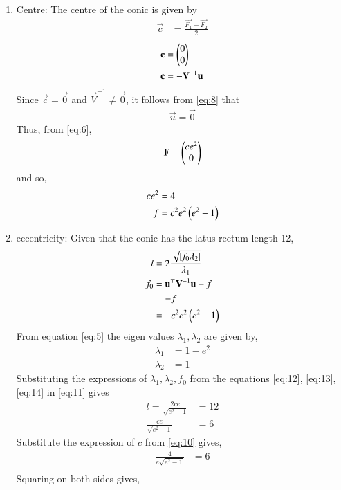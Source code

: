 \documentclass[journal,12pt,twocolumn]{IEEEtran}
\begin{document}
\begin{enumerate}
\begin{enumerate}
\item Centre: The centre of the conic is given by
\begin{align}
\vec{c} &= \frac{\vec{F_1} + \vec{F_2}}{2}
\end{align}
\begin{align}
\mathbf{c} &= \begin{pmatrix}0\\0\end{pmatrix}\\
\mathbf{c} &= -\mathbf{V}^{-1}\mathbf{u}
\label{eq:8}
\end{align}
Since $\vec{c} = \vec{0}$ and $\vec{V}^{-1} \neq \vec{0}$, it follows from \eqref{eq:8} that 
\begin{align}
\vec{u} = \vec{0}
\end{align}
Thus, from \eqref{eq:6},
\begin{align}
\mathbf{F} = \begin{pmatrix}ce^2\\0\end{pmatrix}
\label{eq:9}
\end{align}
and so,
\begin{align}
ce^2 &= 4
\label{eq:10}\\
f &= c^2e^2\left(e^2-1\right)
\label{eq:10_a}
\end{align}
\item eccentricity: Given that the conic has the latus rectum length 12,
\begin{align}
l &= 2\frac{\sqrt{\left\vert f_0\lambda_2\right\vert}}{\lambda_1}
\label{eq:11}\\
f_0 &= \mathbf{u}^\top\mathbf{V}^{-1}\mathbf{u} - f\\
&= -f\\
&= -c^2e^2\left(e^2-1\right)
\label{eq:12}
\end{align}
From equation \eqref{eq:5} the eigen values $\lambda_1, \lambda_2$ are given by,
\begin{align}
\lambda_1 &= 1-e^2
\label{eq:13}\\
\lambda_2 &= 1
\label{eq:14}
\end{align}
Substituting the expressions of $\lambda_1,\lambda_2, f_0$ from the equations \eqref{eq:12}, \eqref{eq:13}, \eqref{eq:14} in \eqref{eq:11} gives
\begin{align}
l = \frac{2ce}{\sqrt{e^2-1}} &= 12\\
\frac{ce}{\sqrt{e^2-1}} &= 6
\end{align}
Substitute the expression of $c$ from \eqref{eq:10} gives,
\begin{align}
\frac{4}{e\sqrt{e^2-1}} &= 6\\
\end{align}
Squaring on both sides gives,
\begin{align}

\end{align}
\end{enumerate}
\end{enumerate}
\end{document}

